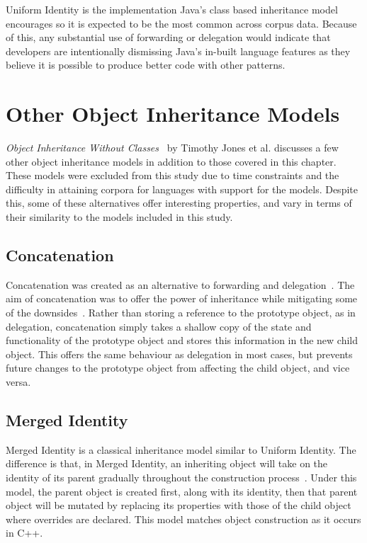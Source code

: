 Uniform Identity is the implementation Java's class based inheritance model encourages so it is expected to be the most common across corpus data. Because of this, any substantial use of forwarding or delegation would indicate that developers are intentionally dismissing Java's in-built language features as they believe it is possible to produce better code with other patterns.

\section{Other Object Inheritance Models}
\textit{Object Inheritance Without Classes~\cite{InheritanceWithoutClasses}} by Timothy Jones et al. discusses a few other object inheritance models in addition to those covered in this chapter. These models were excluded from this study due to time constraints and the difficulty in attaining corpora for languages with support for the models. Despite this, some of these alternatives offer interesting properties, and vary in terms of their similarity to the models included in this study.

\subsection{Concatenation}
Concatenation was created as an alternative to forwarding and delegation~\cite{InheritanceWithoutClasses}. The aim of concatenation was to offer the power of inheritance while mitigating some of the downsides~\cite{Concatenation}. Rather than storing a reference to the prototype object, as in delegation, concatenation simply takes a shallow copy of the state and functionality of the prototype object and stores this information in the new child object. This offers the same behaviour as delegation in most cases, but prevents future changes to the prototype object from affecting the child object, and vice versa.

\subsection{Merged Identity}
Merged Identity is a classical inheritance model similar to Uniform Identity. The difference is that, in Merged Identity, an inheriting object will take on the identity of its parent gradually throughout the construction process~\cite{InheritanceWithoutClasses}. Under this model, the parent object is created first, along with its identity, then that parent object will be mutated by replacing its properties with those of the child object where overrides are declared. This model matches object construction as it occurs in C++.
